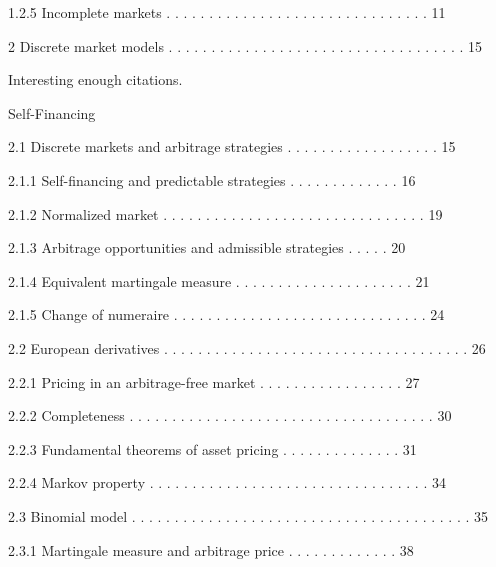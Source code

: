 1.2.5 Incomplete markets . . . . . . . . . . . . . . . . . . . . . . . . . . . . . . . 11



2 Discrete market models . . . . . . . . . . . . . . . . . . . . . . . . . . . . . . . . . . . 15

Interesting enough citations.

Self-Financing

2.1 Discrete markets and arbitrage strategies . . . . . . . . . . . . . . . . . . 15



2.1.1 Self-financing and predictable strategies . . . . . . . . . . . . . 16



2.1.2 Normalized market . . . . . . . . . . . . . . . . . . . . . . . . . . . . . . . 19



2.1.3 Arbitrage opportunities and admissible strategies . . . . . 20



2.1.4 Equivalent martingale measure . . . . . . . . . . . . . . . . . . . . . 21



2.1.5 Change of numeraire . . . . . . . . . . . . . . . . . . . . . . . . . . . . . . 24



2.2 European derivatives . . . . . . . . . . . . . . . . . . . . . . . . . . . . . . . . . . . . 26



2.2.1 Pricing in an arbitrage-free market . . . . . . . . . . . . . . . . . 27



2.2.2 Completeness . . . . . . . . . . . . . . . . . . . . . . . . . . . . . . . . . . . . 30



2.2.3 Fundamental theorems of asset pricing . . . . . . . . . . . . . . 31



2.2.4 Markov property . . . . . . . . . . . . . . . . . . . . . . . . . . . . . . . . . 34



2.3 Binomial model . . . . . . . . . . . . . . . . . . . . . . . . . . . . . . . . . . . . . . . . 35



2.3.1 Martingale measure and arbitrage price . . . . . . . . . . . . . 38



